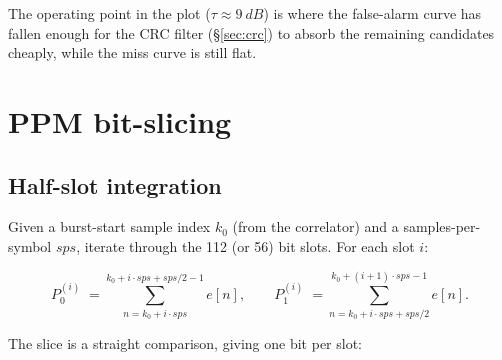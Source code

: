 \documentclass[11pt,a4paper]{article}
\begin{document}
The operating point in the plot ($\tau \approx \SI{9}{dB}$) is where the
false-alarm curve has fallen enough for the CRC filter (\S\ref{sec:crc})
to absorb the remaining candidates cheaply, while the miss curve is
still flat.

\section{PPM bit-slicing}

\subsection{Half-slot integration}

Given a burst-start sample index $k_0$ (from the correlator) and a
samples-per-symbol $sps$, iterate through the 112 (or 56) bit slots.
For each slot $i$:

\begin{equation}
P_0^{(i)} \;=\!\!\!\! \sum_{n=k_0 + i\cdot sps}^{k_0 + i\cdot sps + sps/2 - 1}\!\!\!\!\! e[n],
\qquad
P_1^{(i)} \;=\!\!\!\!\!\! \sum_{n=k_0 + i\cdot sps + sps/2}^{k_0 + (i+1)\cdot sps - 1}\!\!\!\!\!\! e[n].
\end{equation}

The slice is a straight comparison, giving one bit per slot:

\begin{center}
\end{center}
\end{document}

